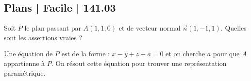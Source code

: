 \subsection{Plans | Facile | 141.03}

\begin{question}

Soit $P$ le plan passant par $A(1,1,0)$ et  de vecteur normal $\vec{n}(1,-1,1)$. Quelles sont les assertions vraies ?
\begin{answers}



   
\end{answers}
\begin{explanations}
Une équation de $P$ est de la forme : $x-y+z+a=0$ et on cherche $a$ pour que $A$ appartienne à $P$. On résout cette équation pour trouver une représentation paramétrique. 
\end{explanations}

\end{question}



